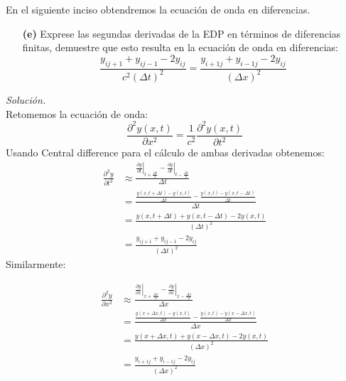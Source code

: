\documentclass[11pt]{article}
\begin{document}
	En el siguiente inciso obtendremos la ecuación de onda en diferencias.
	
\begin{enumerate}
	\item [\textbf{(e)}] Exprese las segundas derivadas de la EDP en términos de diferencias finitas, demuestre que esto resulta en la ecuación de onda en diferencias:
	$$\frac{y_{ij+1} + y_{i j-1}- 2y_{ij}}{c^2 (\Delta t)^2} = \frac{y_{i+1j} + y_{i-1 j}- 2y_{ij}}{ (\Delta x)^2}$$
\end{enumerate}
\textit{Solución.}\\	
	Retomemos la ecuación de onda:
	\begin{equation}
		\frac{\partial^2 y(x,t)}{\partial x^2} = \frac{1}{c^2} \frac{\partial^2 y(x,t)}{\partial t^2}	\label{econda}
	\end{equation}
	Usando Central difference para el cálculo de ambas derivadas obtenemos:
	\begin{align*}
		\frac{\partial^2 y}{\partial t^2} &\approx \frac{\left.\frac{\partial y}{\partial t}\right|_{t+\frac{\Delta t}{2}}  - \left.\frac{\partial y}{\partial t}\right|_{t-\frac{\Delta t}{2}}}{\Delta t}	\\
		&=\frac{\frac{y(x,t+\Delta t) - y(x,t)}{\Delta t} - \frac{y(x,t) - y(x,t-\Delta t)}{\Delta t}}{\Delta t}	\\
		&= \frac{y(x,t+\Delta t) + y(x,t-\Delta t) - 2y(x,t)}{(\Delta t)^2}	\\
		&= \frac{y_{ij+1} + y_{ij-1} -2y_{ij}}{(\Delta t )^2}
	\end{align*}
	Similarmente:
	
	\begin{align*}
		\frac{\partial^2 y}{\partial x^2} &\approx \frac{\left.\frac{\partial y}{\partial x}\right|_{x+\frac{\Delta x}{2}}  - \left.\frac{\partial y}{\partial x}\right|_{x-\frac{\Delta x}{2}}}{\Delta x}	\\
		&=\frac{\frac{y(x+\Delta x,t) - y(x,t)}{\Delta x} - \frac{y(x,t) - y(x-\Delta x,t)}{\Delta x}}{\Delta x}	\\
		&= \frac{y(x+\Delta x,t) + y(x-\Delta x,t) - 2y(x,t)}{(\Delta x)^2}	\\
		&= \frac{y_{i+1j} + y_{i-1j} -2y_{ij}}{(\Delta x )^2}
	\end{align*}
	
\end{document}
